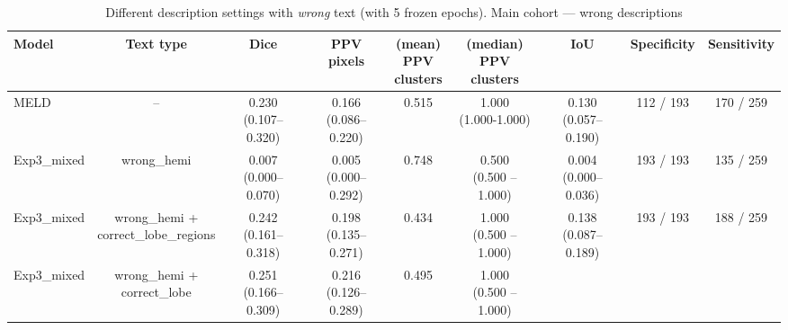 \documentclass[a4paper,12pt]{article}
\begin{document}
\begin{table}[h]
\centering
\tiny
\caption{Different description settings with \emph{wrong} text (with 5 frozen epochs). Main cohort — wrong descriptions}
\label{tab:wrong_main_cohort_mix_freeze}
\begin{tabular}{lcccccccc}
\textbf{Model} &
\textbf{Text type} &
\textbf{Dice} &
\makecell{\textbf{PPV}\\\textbf{pixels}} &
\makecell{\textbf{(mean)} \\\textbf{PPV} \\\textbf{clusters}} & \makecell{\textbf{(median)} \\\textbf{PPV} \\\textbf{clusters}} & 
\textbf{IoU} & 
\textbf{Specificity} &
\textbf{Sensitivity} \\
\hline
MELD & -- &
\makecell{0.230\\(0.107--0.320)} &
\makecell{0.166\\(0.086--0.220)} &
\colorbox{orange!20}{0.515} &
\makecell{1.000 \\ (1.000-1.000)} &
\makecell{0.130\\(0.057--0.190)} &
112 / 193 &
170 / 259 \\
\hline
Exp3\_mixed & 
wrong\_hemi &
\makecell{0.007 \\ (0.000--0.070)} &
\makecell{0.005 \\ (0.000--0.292)} &
\colorbox{green!20}{0.748} &
\makecell{0.500 \\ (0.500 -- 1.000)} &
\makecell{0.004 \\ (0.000--0.036)} &
193 / 193 &
135 / 259 \\
\hline
Exp3\_mixed & 
\makecell{wrong\_hemi + \\ correct\_lobe\_regions} &
\makecell{0.242 \\ (0.161--0.318)} &
\makecell{\colorbox{orange!20}{0.198} \\ (0.135--0.271)} &
0.434 &
\makecell{1.000 \\ (0.500 -- 1.000)} &
\makecell{0.138 \\ (0.087--0.189)} &
193 / 193 &
\colorbox{orange!20}{188 / 259} \\
\hline
Exp3\_mixed & 
\makecell{wrong\_hemi + \\ correct\_lobe} &
\makecell{\colorbox{green!20}{0.251} \\ (0.166--0.309)} &
\makecell{\colorbox{green!20}{0.216} \\ (0.126--0.289)} &
0.495 &
\makecell{1.000 \\ (0.500 -- 1.000)} &

\end{tabular}
\end{table}
\end{document}
